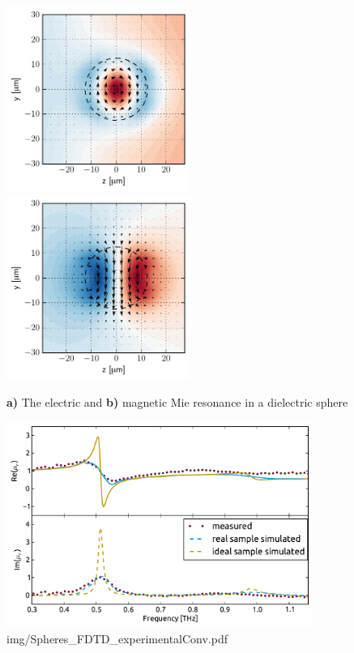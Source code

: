 \begin{figure} \caption{\textbf{a)} The electric and \textbf{b)} magnetic Mie resonance in a dielectric sphere}  \centering \includegraphics[width=6cm]{img/sphere_Mie_mode_electric.pdf} 
 \centering \includegraphics[width=6cm]{img/sphere_Mie_mode_magnetic.pdf} \end{figure}

\begin{figure} \caption{img/Spheres\_FDTD\_experimentalConv.pdf}  \centering \includegraphics[width=10cm]{img/Spheres_FDTD_experimentalConv.pdf} \end{figure} \clearpage

